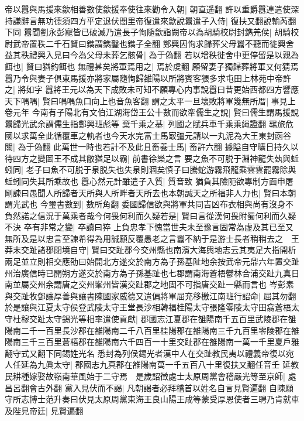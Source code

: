 帝以囂與馬援來歙相善數使歙援奉使往來勸令入朝|{
	朝直遥翻}
許以重爵囂連遣使深持謙辭言無功德須四方平定退伏閭里帝復遣來歙說囂遣子入侍|{
	復扶又翻說輸芮翻下同}
囂聞劉永彭寵皆已破滅乃遣長子恂隨歙詣闕帝以為胡騎校尉封鐫羌侯|{
	胡騎校尉武帝置秩二千石賢曰鐫謂鐫鑿也鐫子全翻}
鄭興因恂求歸葬父母囂不聽而徙興舍益其秩禮興入見曰今為父母未葬乞骸骨|{
	為于偽翻}
若以增秩徙舍中更停留是以親為餌也|{
	賢曰猶釣餌也}
無禮甚矣將軍焉用之|{
	焉於䖍翻}
願留妻子獨歸葬將軍又何猜焉囂乃令與妻子俱東馬援亦將家屬隨恂歸雒陽以所將賓客猥多求屯田上林苑中帝許之|{
	將如字}
囂將王元以為天下成敗未可知不願專心内事說囂曰昔更始西都四方響應天下喁喁|{
	賢曰喁喁魚口向上也音魚客翻}
謂之太平一旦壞敗將軍幾無所厝|{
	事見上卷元年}
今南有子陽北有文伯江湖海岱王公十數而欲牽儒生之說|{
	賢曰儒生謂馬援說囂歸光武余謂儒生指鄭興班彪等}
棄千乘之基|{
	列國之賦兵車千乘乘䋲證翻}
羈旅危國以求萬全此循覆車之軌者也今天水完富士馬㝡彊元請以一丸泥為大王東封函谷關|{
	為于偽翻}
此萬世一時也若計不及此且畜養士馬|{
	畜許六翻}
據隘自守曠日持久以待四方之變圖王不成其敝猶足以霸|{
	前書徐樂之言}
要之魚不可脱于淵神龍失埶與蚯蚓同|{
	老子曰魚不可脱于泉脱失也失泉則涸矣慎子曰騰蛇游霧飛龍乘雲雲罷霧除與蚯蚓同失其所乘故也}
囂心然元計雖遣子入質|{
	質音致}
猶負其險阨欲專制方面申屠剛諫曰愚聞人所歸者天所與人所畔者天所去也本朝誠天之所福非人力也|{
	賢曰本朝謂光武也}
今璽書數到|{
	數所角翻}
委國歸信欲與將軍共同吉凶布衣相與尚有沒身不負然諾之信況于萬乘者哉今何畏何利而久疑若是|{
	賢曰言從漢何畏附蜀何利而久疑不決}
卒有非常之變|{
	卒讀曰猝}
上負忠孝下愧當世夫未至豫言固常為虚及其已至又無所及是以忠言至諫希得為用誠願反覆愚老之言囂不納于是游士長者稍稍去之　王莽末交趾諸郡閉境自守|{
	賢曰交趾郡今交州縣也南濱大海輿地志云其夷足大指開析兩足並立則相交應劭曰始開北方遂交於南方為子孫基阯地余按武帝元鼎六年置交趾州治廣信時已開朔方遂交於南方為子孫基趾也七郡謂南海蒼梧鬱林合浦交趾九真日南並屬交州余謂唐之交州峯州皆漢交趾郡之地固不可指唐交趾一縣而言也}
岑彭素與交趾牧鄧讓厚善與讓書陳國家威德又遣偏將軍屈充移檄江南班行詔命|{
	屈其勿翻}
於是讓與江夏太守侯登武陵太守王堂長沙相韓福桂陽太守張隆零陵太守田翕蒼梧太守杜穆交趾太守錫光等相率遣使貢獻|{
	郡國志江夏郡在雒陽南千五百里武陵郡在雒陽南二千一百里長沙郡在雒陽南二千八百里桂陽郡在雒陽南三千九百里零陵郡在雒陽南三千三百里蒼梧郡在雒陽南六千四百一十里交趾郡在雒陽南一萬一千里夏戶雅翻守式又翻下同錫姓光名}
悉封為列侯錫光者漢中人在交趾教民夷以禮義帝復以宛人任延為九眞太守|{
	郡國志九真郡在雒陽南萬一千五百八十里復扶又翻任音壬}
延教民耕種嫁娶故嶺南華風始于二守焉　是歲詔徵處士太原周黨會稽嚴光等至京師|{
	處昌呂翻會古外翻}
黨入見伏而不謁|{
	凡朝謁者必拜稽首以姓名自言見賢遍翻}
自陳願守所志博士范升奏曰伏見太原周黨東海王良山陽王成等蒙受厚恩使者三聘乃肯就車及陛見帝廷|{
	見賢遍翻}
